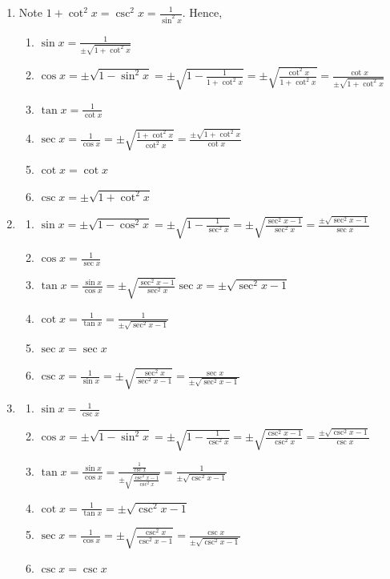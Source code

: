 \documentclass[english]{book}
\begin{document}
\begin{enumerate}
\begin{enumerate}
\begin{enumerate}[\hspace{1cm}a)]
          \end{enumerate}
    \item Note $1 + \cot^{2} x = \csc^{2} x = \frac{1}{\sin^{2} x}$. Hence,
          \begin{enumerate}[\hspace{1cm}a)]
            \item $\sin x = \frac{1}{\pm \sqrt{1+ \cot^{2} x}}$
            \item $\cos x = \pm\sqrt{1-\sin^{2}x} = \pm\sqrt{1-\frac{1}{1+\cot^{2} x}} = \pm\sqrt{\frac{\cot^{2} x}{1+ \cot^{2}x}} = \frac{\cot x}{\pm\sqrt{1+ \cot^{2} x}}$
            \item $\tan x = \frac{1}{\cot x}$
            \item $\sec x = \frac{1}{\cos x} = \pm \sqrt{\frac{1+ \cot^{2} x}{ \cot^{2} x}} = \frac{\pm \sqrt{1+ \cot^{2} x}}{\cot x}$
            \item $\cot x = \cot x$
            \item $\csc x = \pm \sqrt{1+ \cot^{2} x}$
          \end{enumerate}
    \item \begin{enumerate}[\hspace{1cm}a)]
            \item $\sin x = \pm \sqrt{1 - \cos^{2} x} = \pm \sqrt{1 - \frac{1}{\sec^{2} x}} = \pm \sqrt{\frac{\sec^{2} x -1}{\sec^{2} x}} = \frac{\pm \sqrt{\sec^{2} x -1}}{\sec x}$
            \item $\cos x = \frac{1}{\sec x}$
            \item $\tan x = \frac{\sin x}{\cos x} = \pm \sqrt{\frac{\sec^{2} x -1}{\sec^{2} x}}  \sec x = \pm \sqrt{\sec^{2} x -1}$
            \item $\cot x = \frac{1}{\tan x} = \frac{1}{\pm \sqrt{\sec^{2} x -1}}$
            \item $\sec x = \sec x $
            \item $\csc x = \frac{1}{\sin x} = \pm \sqrt{\frac{\sec^{2} x}{\sec^{2} x -1}} = \frac{\sec x}{\pm \sqrt{\sec^{2} x -1}}$
          \end{enumerate}
    \item \begin{enumerate}[\hspace{1cm}a)]
            \item $\sin x = \frac{1}{\csc x}$
            \item $\cos x = \pm \sqrt{1- \sin^{2} x} = \pm \sqrt{1- \frac{1}{\csc^{2} x}} = \pm \sqrt{\frac{\csc^{2} x -1}{\csc^{2} x}} = \frac{\pm \sqrt{\csc^{2} x -1}}{\csc x}$
            \item $\tan x = \frac{\sin x}{\cos x} = \frac{\frac{1}{\csc x}}{\pm \sqrt{\frac{\csc^{2} x -1}{\csc^{2} x}}} = \frac{1}{\pm \sqrt{\csc^{2} x -1}}$
            \item $\cot x = \frac{1}{\tan x} = \pm \sqrt{\csc^{2} x -1}$
            \item $\sec x = \frac{1}{\cos x} = \pm \sqrt{\frac{\csc^{2} x}{\csc^{2} x -1}} = \frac{\csc x}{\pm \sqrt{\csc^{2} x -1}}$
            \item $\csc x = \csc x$


\end{enumerate}
\end{enumerate}
\end{enumerate}
\end{document}
